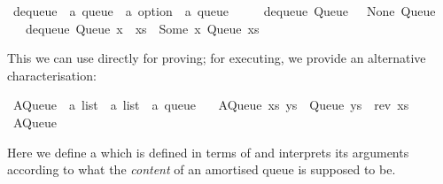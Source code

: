 \begin{isabellebody}
\isanewline
{}\isamarkupfalse%
\ dequeue\ {}{}\ {}{}a\ queue\ {}\ {}a\ option\ {}\ {}a\ queue{}\ \isanewline
\ \ \ \ {}dequeue\ {}Queue\ {}{}{}\ {}\ {}None{}\ Queue\ {}{}{}{}\isanewline
\ \ {}\ {}dequeue\ {}Queue\ {}x\ {}\ xs{}{}\ {}\ {}Some\ x{}\ Queue\ xs{}{}%
\endisatagquote
{\isafoldquote}%
%
\isadelimquote
%
\endisadelimquote
%
\begin{isamarkuptext}%
\noindent This we can use directly for proving;  for executing,
  we provide an alternative characterisation:%
\end{isamarkuptext}%
\isamarkuptrue%
%
\isadelimquote
%
\endisadelimquote
%
\isatagquote
{}\isamarkupfalse%
\ AQueue\ {}{}\ {}{}a\ list\ {}\ {}a\ list\ {}\ {}a\ queue{}\ \isanewline
\ \ {}AQueue\ xs\ ys\ {}\ Queue\ {}ys\ {}\ rev\ xs{}{}\isanewline
\isanewline
{}\isamarkupfalse%
\ AQueue%
\endisatagquote
{\isafoldquote}%
%
\isadelimquote
%
\endisadelimquote
%
\begin{isamarkuptext}%
\noindent Here we define a   which
  is defined in terms of  and interprets its arguments
  according to what the \emph{content} of an amortised queue is supposed
  to be.


\end{isamarkuptext}
\end{isabellebody}
